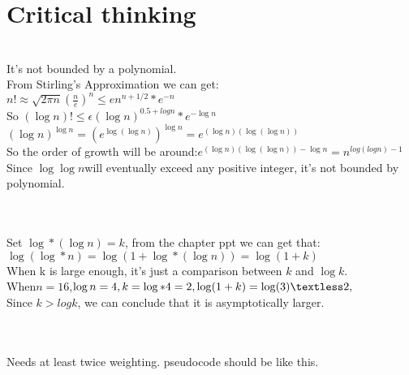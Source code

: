 \documentclass{article}
\begin{document}
\section{Critical thinking}
\\It's not bounded by a polynomial.
\\From Stirling’s Approximation we can get:
\\$n!\approx \sqrt{2\pi n}(\frac{n}{e})^n \leq en^{n+1/2}*e^{-n}$
\\So $(\log n)! \leq \epsilon (\log n)^{0.5+log n}*e^{-\log n}$
\\$(\log n)^{\log n} = (e^{\log (\log n)})^{\log n} = e^{(\log n)(\log(\log n))}$
\\ So the order of growth will be around:$e^{(\log n)(\log (\log n))- \log n} = n^{log(log n) - 1}$
\\Since $\log{\log n} $will eventually exceed any positive integer, it's not bounded by polynomial. 
\\\\
\\Set $\log*(\log n) = k$, from the chapter ppt we can get that:
\\$\log(\log *n) = \log (1+\log*(\log n)) = \log (1+k) $
\\When k is large enough, it's just a comparison between $k $ and $ \log k$.
\\When$n = 16$,$\log n = 4, k = \log *4 =2, \log(1+k) = \log (3) \textless 2,$
\\Since $k>log k$, we can conclude that it is asymptotically larger.
\\\\
\\Needs at least twice weighting. pseudocode should be like this.
\\\\
\end{document}
